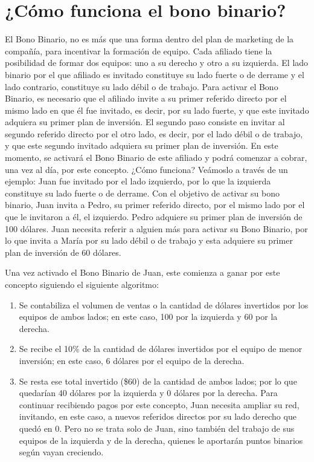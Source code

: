 \documentclass[12pt,letterpaper]{article}
\begin{document}
\section{¿Cómo funciona el bono binario?}
El Bono Binario, no es más que una forma dentro del plan de marketing de la compañía, para incentivar la formación de equipo. Cada afiliado tiene la posibilidad de formar dos equipos: uno a su derecho y otro a su izquierda. El lado binario por el que afiliado es invitado constituye su lado fuerte o de derrame y el lado contrario, constituye su lado débil o de trabajo. Para activar el Bono Binario, es necesario que el afiliado invite a su primer referido directo por el mismo lado en que él fue invitado, es decir, por su lado fuerte, y que este invitado adquiera su primer plan de inversión. El segundo paso consiste en invitar al segundo referido directo por el otro lado, es decir, por el lado débil o de trabajo, y que este segundo invitado adquiera su primer plan de inversión. En este momento, se activará el Bono Binario de este afiliado y podrá comenzar a cobrar, una vez al día, por este concepto. ¿Cómo funciona? Veámoslo a través de un ejemplo: Juan fue invitado por el lado izquierdo, por lo que la izquierda constituye su lado fuerte o de derrame. Con el objetivo de activar su bono binario, Juan invita a Pedro, su primer referido directo, por el mismo lado por el que le invitaron a él, el izquierdo. Pedro adquiere su primer plan de inversión de 100 dólares. Juan necesita referir a alguien más para activar su Bono Binario, por lo que invita a María por su lado débil o de trabajo y esta adquiere su primer plan de inversión de 60 dólares.

Una vez activado el Bono Binario de Juan, este comienza a ganar por este concepto siguiendo el siguiente algoritmo:

\begin{enumerate}
	\item Se contabiliza el volumen de ventas o la cantidad de dólares invertidos por los equipos de ambos lados; en este caso, 100 por la izquierda y 60 por la derecha.
	\item Se recibe el 10\% de la cantidad de dólares invertidos por el equipo de menor inversión; en este caso, 6 dólares por el equipo de la derecha.
	\item Se resta ese total invertido (\$60) de la cantidad de ambos lados; por lo que quedarían 40 dólares por la izquierda y 0 dólares por la derecha. Para continuar recibiendo pagos por este concepto, Juan necesita ampliar su red, invitando, en este caso, a nuevos referidos directos por su lado derecho que quedó en 0. Pero no se trata solo de Juan, sino también del trabajo de sus equipos de la izquierda y de la derecha, quienes le aportarán puntos binarios según vayan creciendo.
\end{enumerate}
\end{document}
